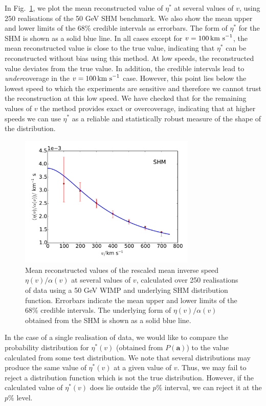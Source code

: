 In Fig.~\ref{fig:Poly:eta_stats}, we plot the mean reconstructed value of $\eta^*$ at several values of $v$, using 250 realisations of the 50 GeV SHM benchmark. We also show the mean upper and lower limits of the 68\% credible intervals as errorbars. The form of $\eta^*$ for the SHM is shown as a solid blue line. In all cases except for $v=100 \,\textrm{km s}^{-1}$, the mean reconstructed value is close to the true value, indicating that $\eta^*$ can be reconstructed without bias using this method. At low speeds, the reconstructed value deviates from the true value. In addition, the credible intervals lead to \textit{under}coverage in the $v=100 \,\textrm{km s}^{-1}$ case. However, this point lies below the lowest speed to which the experiments are sensitive and therefore we cannot trust the reconstruction at this low speed. We have checked that for the remaining values of $v$ the method provides exact or overcoverage, indicating that at higher speeds we can use $\eta^*$ as a reliable and statistically robust measure of the shape of the distribution.

\begin{figure}[t]
\centering
  \includegraphics[width=0.75\textwidth]{Poly/Eta.pdf}
  \caption{Mean reconstructed values of the rescaled mean inverse speed $\eta(v)/\alpha(v)$ at several values of $v$, calculated over 250 realisations of data using a 50 GeV WIMP and underlying SHM distribution function. Errorbars indicate the mean upper and lower limits of the 68\% credible intervals. The underlying form of $\eta(v)/\alpha(v)$ obtained from the SHM is shown as a solid blue line.}
  \label{fig:Poly:eta_stats}
\end{figure}


In the case of a single realisation of data, we would like to compare the probability distribution for $\eta^*(v)$ (obtained from $P(\textbf{a})$) to the value calculated from some test distribution. We note that several distributions may produce the same value of $\eta^*(v)$ at a given value of $v$. Thus, we may fail to reject a distribution function which is not the true distribution. However, if the calculated value of $\eta^*(v)$ does lie outside the $p\%$ interval, we can reject it at the $p\%$ level.

